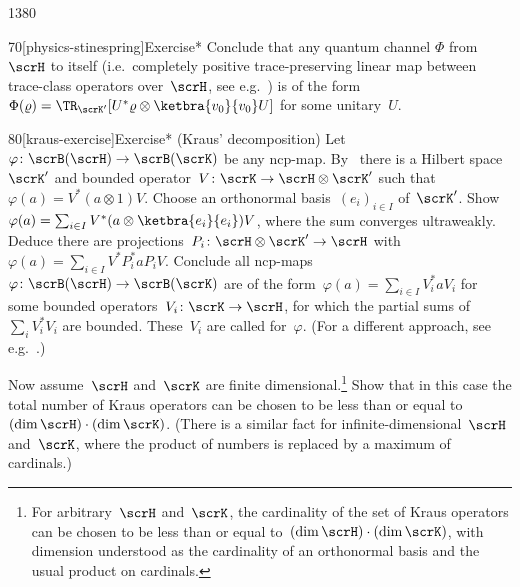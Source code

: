 \begin{parsec}{1380}
\begin{point}{70}[physics-stinespring]{Exercise*}
    Conclude that any quantum channel
        $\Phi$ from~$\scrH$ to itself
        (i.e.~completely positive trace-preserving
            linear map between trace-class operators over~$\scrH$,
            see e.g.~\cite[\S2.6.2]{tomamichel})
        is of the
        form~$\Phi(\varrho) = \TR_{\scrK'}
            [U^* \varrho \otimes \ketbra{v_0}{v_0} U]$
            for some unitary~$U$.
\end{point}
\begin{point}{80}[kraus-exercise]{Exercise* (Kraus' decomposition)}%
Let~$\varphi \colon \scrB(\scrH) \to \scrB(\scrK)$
    be any ncp-map.
By~
    there is a Hilbert space~$\scrK'$
    and bounded operator~$V\colon \scrK \to \scrH \otimes \scrK'$
    such that~$\varphi(a) = V^* (a \otimes 1) V$.
Choose an orthonormal basis~$(e_i)_{i \in I}$ of~$\scrK'$.
Show~$\varphi(a) = \sum_{i \in I} V^* (a \otimes \ketbra{e_i}{e_i}) V$,
where the sum converges ultraweakly.
Deduce there are projections~$P_i \colon \scrH \otimes \scrK' \to \scrH$
with~$\varphi(a) = \sum_{i \in I} V^*P_i^* a P_iV$.
Conclude all ncp-maps~$\varphi\colon \scrB(\scrH) \to \scrB(\scrK)$
are of the form~$\varphi(a) = \sum_{i \in I} V_i^* a V_i$
for some bounded operators~$V_i\colon \scrK \to \scrH$,
for which the partial sums of~$\sum_i V_i^*V_i$ are bounded.
These~$V_i$ are called 
    for~$\varphi$.  (For a different approach,
    see e.g.~\cite[thm.~2.3]{davies1976quantum}.)

Now assume~$\scrH$ and~$\scrK$ are finite dimensional.\footnote{%
        For arbitrary~$\scrH$ and~$\scrK$,
            the cardinality of the set of Kraus operators
            can be chosen to be less than or equal
            to~$(\dim \scrH) \cdot (\dim \scrK)$,
            with dimension understood as the cardinality of
                an orthonormal basis and the usual product on cardinals.}
Show that in this case
    the total number of Kraus operators can be chosen
    to be less than or equal to~$(\dim \scrH) \cdot (\dim \scrK)$.
    (There is a similar fact for infinite-dimensional~$\scrH$ and~$\scrK$,
        where the product of numbers is replaced by a maximum of cardinals.)
\end{point}
\end{parsec}

